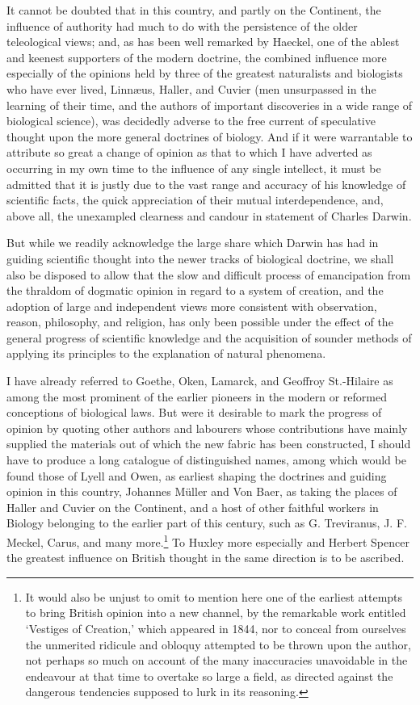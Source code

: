 \documentclass[a4paper, 11pt, oneside, english]{article}
\begin{document}
It cannot be doubted that in this country, and partly on the Continent, the influence of authority had much to do with the persistence of the older teleological views; and, as has been well remarked by Haeckel, one of the ablest and keenest supporters of the modern doctrine, the combined influence more especially of the opinions held by three of the greatest naturalists and biologists who have ever lived, Linnæus, Haller, and Cuvier (men unsurpassed in the learning of their time, and the authors of important discoveries in a wide range of biological science), was decidedly adverse to the free current of speculative thought upon the more general doctrines of biology. And if it were warrantable to attribute so great a change of opinion as that to which I have adverted as occurring in my own time to the influence of any single intellect, it must be admitted that it is justly due to the vast range and accuracy of his knowledge of scientific facts, the quick appreciation of their mutual interdependence, and, above all, the unexampled clearness and candour in statement of Charles Darwin.

But while we readily acknowledge the large share which Darwin has had in guiding scientific thought into the newer tracks of biological doctrine, we shall also be disposed to allow that the slow and difficult process of emancipation from the thraldom of dogmatic opinion in regard to a system of creation, and the adoption of large and independent views more consistent with observation, reason, philosophy, and religion, has only been possible under the effect of the general progress of scientific knowledge and the acquisition of sounder methods of applying its principles to the explanation of natural phenomena.

I have already referred to Goethe, Oken, Lamarck, and Geoffroy St.-Hilaire as among the most prominent of the earlier pioneers in the modern or reformed conceptions of biological laws. But were it desirable to mark the progress of opinion by quoting other authors and labourers whose contributions have mainly supplied the materials out of which the new fabric has been constructed, I should have to produce a long catalogue of distinguished names, among which would be found those of Lyell and Owen, as earliest shaping the doctrines and guiding opinion in this country, Johannes Müller and Von Baer, as taking the places of Haller and Cuvier on the Continent, and a host of other faithful workers in Biology belonging to the earlier part of this century, such as G. Treviranus, J. F. Meckel, Carus, and many more.\footnote{It would also be unjust to omit to mention here one of the earliest attempts to bring British opinion into a new channel, by the remarkable work entitled `Vestiges of Creation,' which appeared in 1844, nor to conceal from ourselves the unmerited ridicule and obloquy attempted to be thrown upon the author, not perhaps so much on account of the many inaccuracies unavoidable in the endeavour at that time to overtake so large a field, as directed against the dangerous tendencies supposed to lurk in its reasoning.} To Huxley more especially and Herbert Spencer the greatest influence on British thought in the same direction is to be ascribed.
\end{document}
